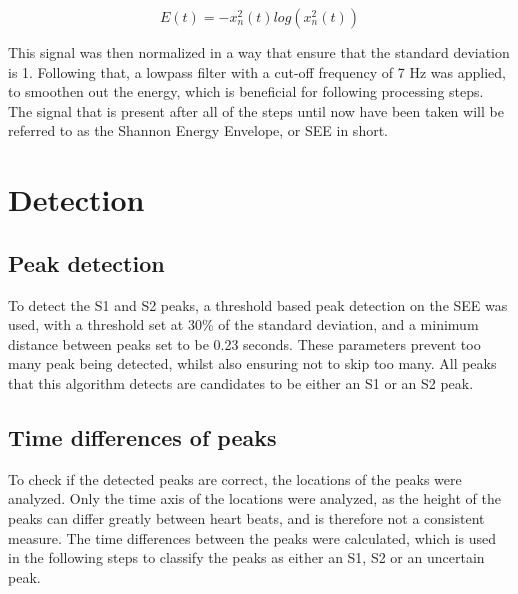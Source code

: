 \begin{equation}
    \label{eq:shannonenergy}
    E(t) = - x_n^2(t) log(x_n^2(t))
\end{equation}

This signal was then normalized in a way that ensure that the standard deviation is 1. Following that, a lowpass filter with a cut-off frequency of 7 Hz was applied, to smoothen out the energy, which is beneficial for following processing steps. The signal that is present after all of the steps until now have been taken will be referred to as the Shannon Energy Envelope, or SEE in short.


\section{Detection}
\subsection{Peak detection}
To detect the S1 and S2 peaks, a threshold based peak detection on the SEE was used, with a threshold set at 30\% of the standard deviation, and a minimum distance between peaks set to be 0.23 seconds. These parameters prevent too many peak being detected, whilst also ensuring not to skip too many. All peaks that this algorithm detects are candidates to be either an S1 or an S2 peak. 
\subsection{Time differences of peaks}
To check if the detected peaks are correct, the locations of the peaks were analyzed. Only the time axis of the locations  were analyzed, as the height of the peaks can differ greatly between heart beats, and is therefore not a consistent measure. 
The time differences between the peaks were calculated, which is used in the following steps to classify the peaks as either an S1, S2 or an uncertain peak.

